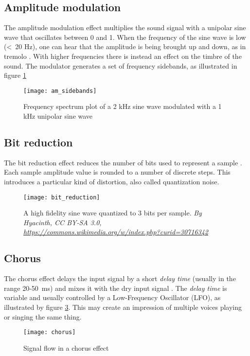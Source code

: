 \subsection{Amplitude modulation}
The amplitude modulation effect multiplies the sound signal with a unipolar sine wave that oscillates between 0 and 1. When the frequency of the sine wave is low (\textless~20 Hz), one can hear that the amplitude is being brought up and down, as in tremolo \citep{serafin2007}. With higher frequencies there is instead an effect on the timbre of the sound. The modulator generates a set of frequency sidebands, as illustrated in figure \ref{fig:am_sidebands}

\begin{figure}[H]
    \centering
    \texttt{[image: am\_sidebands]}
    \caption{Frequency spectrum plot of a 2 kHz sine wave modulated with a 1 kHz unipolar sine wave}
    \label{fig:am_sidebands}
\end{figure}

\subsection{Bit reduction}
The bit reduction effect reduces the number of bits used to represent a sample \citep{bitreduction}. Each sample amplitude value is rounded to a number of discrete steps. This introduces a particular kind of distortion, also called quantization noise.

\begin{figure}[H]
    \centering
    \texttt{[image: bit\_reduction]}
    \caption{A high fidelity sine wave quantized to 3 bits per sample. \textit{By Hyacinth, CC BY-SA 3.0, \url{https://commons.wikimedia.org/w/index.php?curid=30716342}}}
    \label{fig:bit_reduction}
\end{figure}

\subsection{Chorus}
The chorus effect delays the input signal by a short \textit{delay time} (usually in the range 20-50~ms) and mixes it with the dry input signal \citep{chorus}. The \textit{delay time} is variable and usually controlled by a Low-Frequency Oscillator (LFO), as illustrated by figure \ref{fig:chorus}. This may create an impression of multiple voices playing or singing the same thing.

\begin{figure}[H]
    \centering
    \texttt{[image: chorus]}
    \caption{Signal flow in a chorus effect}
    \label{fig:chorus}
\end{figure}


